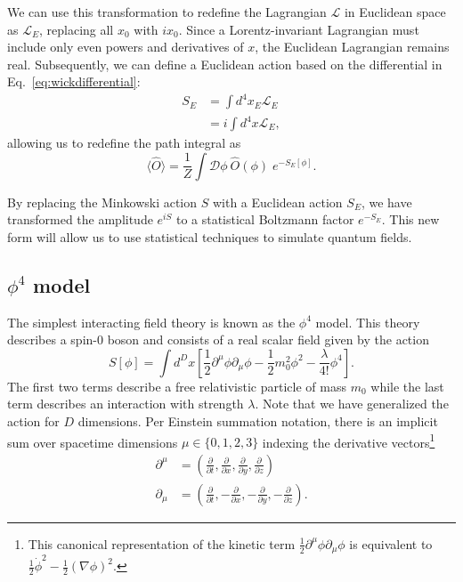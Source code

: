 \documentclass[12pt]{report}
\begin{document}
We can use this transformation to redefine the Lagrangian $\mathcal{L}$ in Euclidean space as $\mathcal{L}_E$, replacing all $x_0$ with $ix_0$. Since a Lorentz-invariant Lagrangian must include only even powers and derivatives of $x$, the Euclidean Lagrangian remains real. Subsequently, we can define a Euclidean action based on the differential in Eq.~\ref{eq:wickdifferential}:
\begin{align}
    S_E &= \int d^4x_E \mathcal{L}_E \\
    &= i \int d^4x \mathcal{L}_E,
\end{align}
allowing us to redefine the path integral as 
\begin{equation}
    \label{eq:pathintegraleuclidean}
    \langle \hat O \rangle = \frac{1}{Z} \int \mathcal{D}\phi \: \hat O (\phi)\; e^{-S_E[\phi]}.
\end{equation}

By replacing the Minkowski action $S$ with a Euclidean action $S_E$, we have transformed the amplitude $e^{iS}$ to a statistical Boltzmann factor $e^{-S_E}$. This new form will allow us to use statistical techniques to simulate quantum fields.

\subsection{$\phi^4$ model}
\label{sec:phi4}

The simplest interacting field theory is known as the $\phi^4$ model. This theory describes a spin-0 boson and consists of a real scalar field given by the action
\begin{equation}
    \label{eq:phi4 action}
    S[\phi] = \int d^D x \left[ \frac{1}{2}\partial^\mu \phi \partial_\mu\phi - \frac{1}{2} m_0^2 \phi^2 - \frac{\lambda}{4!}\phi^4\right].
\end{equation}
The first two terms describe a free relativistic particle of mass $m_0$ while the last term describes an interaction with strength $\lambda$. Note that we have generalized the action for $D$ dimensions. Per Einstein summation notation, there is an implicit sum over spacetime dimensions $\mu\in\{0,1,2,3\}$ indexing the derivative vectors\footnote{This canonical representation of the kinetic term $\frac{1}{2}\partial^\mu\phi\partial_\mu\phi$ is equivalent to $\frac{1}{2}\dot\phi^2-\frac{1}{2}\left(\nabla \phi\right)^2$.}
\begin{align*}
    \partial^\mu &= \left( \frac{\partial}{\partial t}, \frac{\partial}{\partial x},\frac{\partial}{\partial y}, \frac{\partial}{\partial z} \right) \\
    \partial_\mu &= \left( \frac{\partial}{\partial t}, -\frac{\partial}{\partial x}, -\frac{\partial}{\partial y}, -\frac{\partial}{\partial z} \right).
\end{align*}
\end{document}
